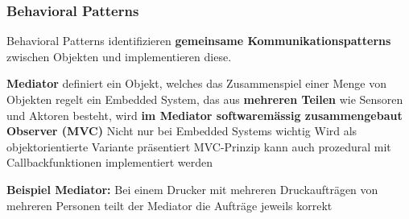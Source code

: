\subsubsection{Behavioral Patterns}

Behavioral Patterns identifizieren \textbf{gemeinsame Kommunikationspatterns} zwischen Objekten und implementieren diese.

\vspace{0.1cm}


    

\begin{outline}
    \1 \textbf{Mediator}
        \2 definiert ein Objekt, welches das Zusammenspiel einer Menge von Objekten regelt
        \2 ein Embedded System, das aus \textbf{mehreren Teilen} wie Sensoren und Aktoren besteht, wird \textbf{im Mediator
            softwaremässig zusammengebaut}
    \1 \textbf{Observer (MVC)}
        \2 Nicht nur bei Embedded Systems wichtig
        \2 Wird als objektorientierte Variante präsentiert
        \2 MVC-Prinzip kann auch prozedural mit Callbackfunktionen implementiert werden
\end{outline}

\vspace{0.1cm}

\textbf{Beispiel Mediator:} Bei einem Drucker mit mehreren Druckaufträgen von mehreren Personen teilt der Mediator die Aufträge jeweils korrekt


